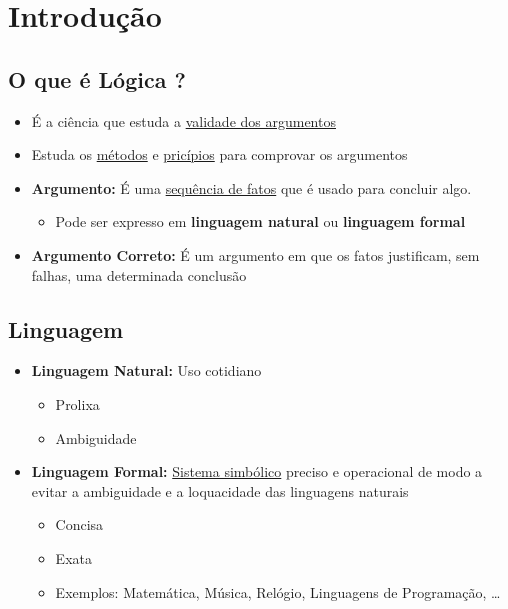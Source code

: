 \section{Introdução}

    \subsection{O que é Lógica ?}
    
        \begin{itemize}[left=0.5cm, align=left, nosep]
            \item É a ciência que estuda a \underline{validade dos argumentos} 
            \item Estuda os \underline{métodos} e \underline{pricípios} para comprovar os argumentos
            \item \textbf{Argumento:} É uma \underline{sequência de fatos} que é usado para concluir algo.   
            \begin{itemize}[left=0.5cm, nosep, label=$\hookrightarrow$]
                \item Pode ser expresso em \textbf{linguagem natural} ou \textbf{linguagem formal}
            \end{itemize}
            \item \textbf{Argumento Correto:} É um argumento em que os fatos justificam, sem falhas, uma 
            determinada conclusão
        \end{itemize}
   
    \subsection{Linguagem}
        \begin{itemize}[left=0.5cm, align=left, nosep]
            \item \textbf{Linguagem Natural:} Uso cotidiano
            \begin{itemize}[left=0.5cm, nosep, label=$\hookrightarrow$]
                \item Prolixa
                \item Ambiguidade
            \end{itemize}
        
            \item \textbf{Linguagem Formal:} \underline{Sistema simbólico} preciso e operacional de modo a evitar a ambiguidade e a loquacidade das linguagens naturais
            \begin{itemize}[left=0.5cm, nosep, label=$\hookrightarrow$]
                \item Concisa
                \item Exata
                \item Exemplos: Matemática, Música, Relógio, Linguagens de Programação, \dots  
            \end{itemize}
        
        \end{itemize}        

